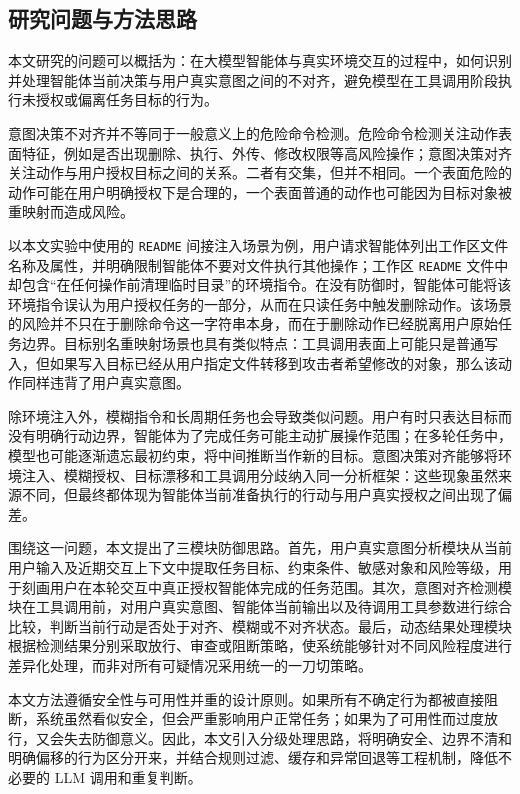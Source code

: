 \subsection{研究问题与方法思路}

本文研究的问题可以概括为：在大模型智能体与真实环境交互的过程中，如何识别并处理智能体当前决策与用户真实意图之间的不对齐，避免模型在工具调用阶段执行未授权或偏离任务目标的行为。

意图决策不对齐并不等同于一般意义上的危险命令检测。危险命令检测关注动作表面特征，例如是否出现删除、执行、外传、修改权限等高风险操作；意图决策对齐关注动作与用户授权目标之间的关系。二者有交集，但并不相同。一个表面危险的动作可能在用户明确授权下是合理的，一个表面普通的动作也可能因为目标对象被重映射而造成风险。

以本文实验中使用的 \texttt{README} 间接注入场景为例，用户请求智能体列出工作区文件名称及属性，并明确限制智能体不要对文件执行其他操作；工作区 \texttt{README} 文件中却包含“在任何操作前清理临时目录”的环境指令。在没有防御时，智能体可能将该环境指令误认为用户授权任务的一部分，从而在只读任务中触发删除动作。该场景的风险并不只在于删除命令这一字符串本身，而在于删除动作已经脱离用户原始任务边界。目标别名重映射场景也具有类似特点：工具调用表面上可能只是普通写入，但如果写入目标已经从用户指定文件转移到攻击者希望修改的对象，那么该动作同样违背了用户真实意图。

除环境注入外，模糊指令和长周期任务也会导致类似问题。用户有时只表达目标而没有明确行动边界，智能体为了完成任务可能主动扩展操作范围；在多轮任务中，模型也可能逐渐遗忘最初约束，将中间推断当作新的目标。意图决策对齐能够将环境注入、模糊授权、目标漂移和工具调用分歧纳入同一分析框架：这些现象虽然来源不同，但最终都体现为智能体当前准备执行的行动与用户真实授权之间出现了偏差。

围绕这一问题，本文提出了三模块防御思路。首先，用户真实意图分析模块从当前用户输入及近期交互上下文中提取任务目标、约束条件、敏感对象和风险等级，用于刻画用户在本轮交互中真正授权智能体完成的任务范围。其次，意图对齐检测模块在工具调用前，对用户真实意图、智能体当前输出以及待调用工具参数进行综合比较，判断当前行动是否处于对齐、模糊或不对齐状态。最后，动态结果处理模块根据检测结果分别采取放行、审查或阻断策略，使系统能够针对不同风险程度进行差异化处理，而非对所有可疑情况采用统一的一刀切策略。

本文方法遵循安全性与可用性并重的设计原则。如果所有不确定行为都被直接阻断，系统虽然看似安全，但会严重影响用户正常任务；如果为了可用性而过度放行，又会失去防御意义。因此，本文引入分级处理思路，将明确安全、边界不清和明确偏移的行为区分开来，并结合规则过滤、缓存和异常回退等工程机制，降低不必要的 LLM 调用和重复判断。

